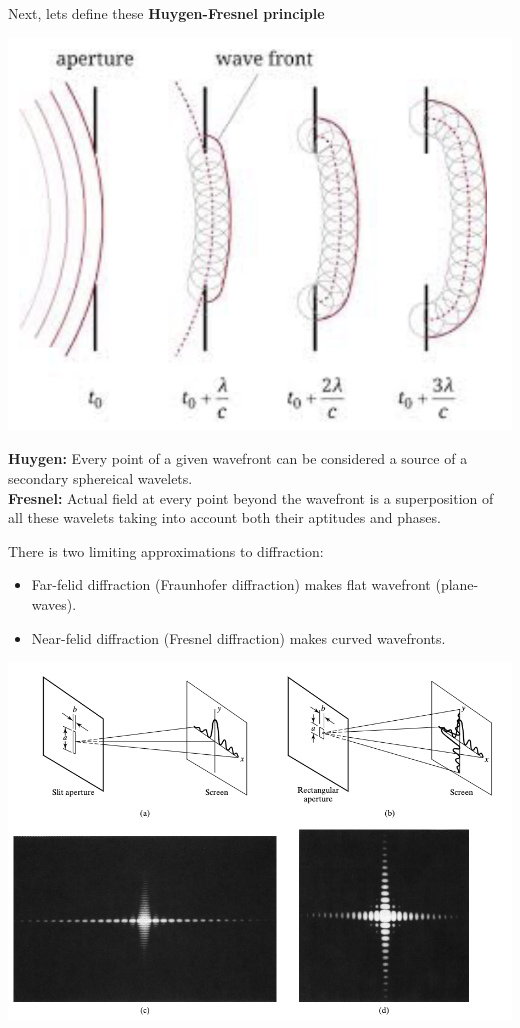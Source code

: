 \documentclass[10pt]{article}
\begin{document}
Next, lets define these \textbf{Huygen-Fresnel principle}
\begin{center}
    \includegraphics*[scale = .5]{imgs/huygens.png}
\end{center}
\textbf{Huygen:} Every point of a given wavefront can be considered a source of a secondary sphereical wavelets.
\\
\textbf{Fresnel:} Actual field at every point beyond the wavefront is a superposition of all these wavelets taking into account both their aptitudes and phases.

\newblock

There is two limiting approximations to diffraction:
\begin{itemize}
    \item Far-felid diffraction (Fraunhofer diffraction) makes flat wavefront (plane-waves).
    \item Near-felid diffraction (Fresnel diffraction) makes curved wavefronts.
\end{itemize}

\begin{center}
    \includegraphics*[scale = .7]{imgs/rectangular-app.png}
\end{center}
\end{document}
